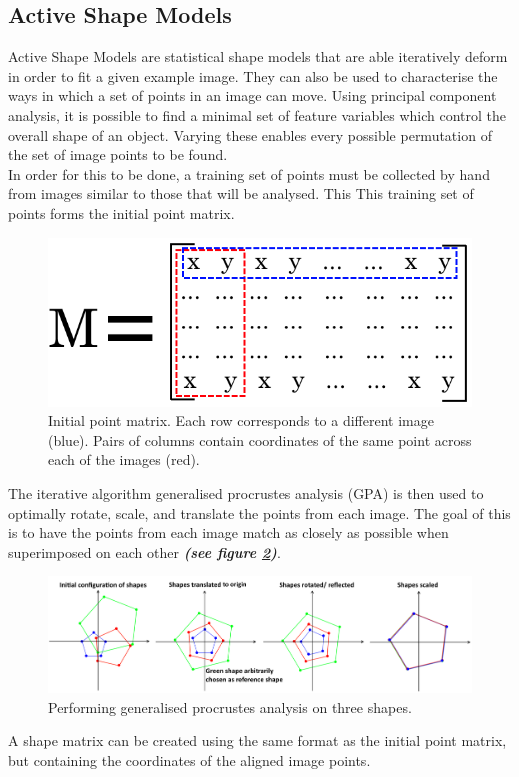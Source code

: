 \documentclass[a4paper, 12pt]{article}
\begin{document}
\subsection{Active Shape Models}
Active Shape Models are statistical shape models that are able iteratively deform in order to fit a given example image. They can also be used to characterise the ways in which a set of points in an image can move. Using principal component analysis\cite{icl_pca}, it is possible to find a minimal set of feature variables which control the overall shape of an object. Varying these enables every possible permutation of the set of image points to be found.\\
In order for this to be done, a training set of points must be collected by hand from images similar to those that will be analysed. This This training set of points forms the initial point matrix.
%
\begin{figure}[H]
	\centering
	\includegraphics[width=.5\linewidth]{shape_matrix.png}
	\caption{Initial point matrix. Each row corresponds to a different image (blue). Pairs of columns contain coordinates of the same point across each of the images (red).}
	\label{fig:shape_matrix}
\end{figure}
%
\noindent The iterative algorithm generalised procrustes analysis (GPA) is then used to optimally rotate, scale, and translate the points from each image. The goal of this is to have the points from each image match as closely as possible when superimposed on each other \textbf{\emph{(see figure \ref{fig:procrastes})}}.
%
\begin{figure}[H]
	\centering
	\includegraphics[width=\linewidth]{generalised_procrastes_ananlysis.png}
	\caption{Performing generalised procrustes analysis on three shapes.}
	\label{fig:procrastes}
\end{figure}
%
\noindent A shape matrix can be created using the same format as the initial point matrix, but containing the coordinates of the aligned image points.
\end{document}
